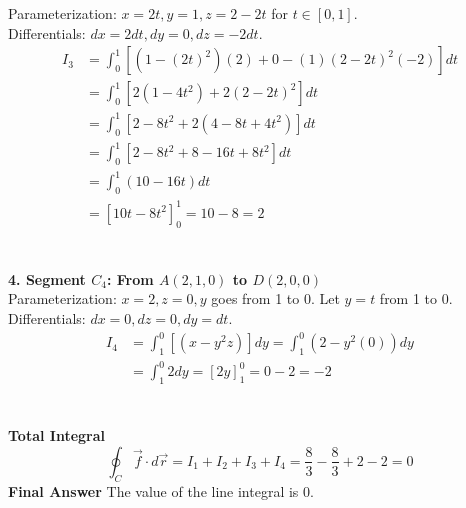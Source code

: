 \documentclass{article}
\begin{document}
Parameterization: $x=2t, y=1, z=2-2t$ for $t \in [0, 1]$.
\\
Differentials: $dx=2dt, dy=0, dz=-2dt$.
\begin{align*}
	I_3 & = \int_0^1 \left[ (1 - (2t)^2)(2) + 0 - (1)(2-2t)^2(-2) \right] dt \\
	    & = \int_0^1 \left[ 2(1 - 4t^2) + 2(2-2t)^2 \right] dt               \\
	    & = \int_0^1 \left[ 2 - 8t^2 + 2(4 - 8t + 4t^2) \right] dt           \\
	    & = \int_0^1 \left[ 2 - 8t^2 + 8 - 16t + 8t^2 \right] dt             \\
	    & = \int_0^1 (10 - 16t) dt                                           \\
	    & = \left[ 10t - 8t^2 \right]_0^1 = 10 - 8 = 2
\end{align*}
\\
\\
\textbf{4. Segment $C_4$: From $A(2,1,0)$ to $D(2,0,0)$}
\\
Parameterization: $x=2, z=0, y$ goes from 1 to 0.
Let $y = t$ from 1 to 0.
\\
Differentials: $dx=0, dz=0, dy=dt$.
\begin{align*}
	I_4 & = \int_1^0 \left[ (x - y^2z) \right] dy = \int_1^0 (2 - y^2(0)) dy \\
	    & = \int_1^0 2 dy = [2y]_1^0 = 0 - 2 = -2
\end{align*}
\\
\\
\textbf{Total Integral}
\[
	\oint_C \vec{f} \cdot d\vec{r} = I_1 + I_2 + I_3 + I_4 = \frac{8}{3} - \frac{8}{3} + 2 - 2 = 0
\]
\textbf{Final Answer } The value of the line integral is 0.

\pagebreak

\end{document}
